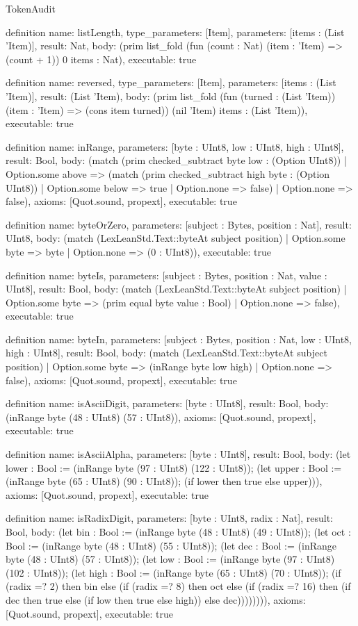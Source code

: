 \begin{lexlean}{TokenAudit}
\begin{semanticmodule}
definition{
  name: listLength,
  type_parameters: [Item],
  parameters: [items : (List 'Item)],
  result: Nat,
  body: (prim list_fold (fun (count : Nat) (item : 'Item) => (count + 1)) 0 items : Nat),
  executable: true
}

definition{
  name: reversed,
  type_parameters: [Item],
  parameters: [items : (List 'Item)],
  result: (List 'Item),
  body: (prim list_fold (fun (turned : (List 'Item)) (item : 'Item) => (cons item turned)) (nil 'Item) items : (List 'Item)),
  executable: true
}

definition{
  name: inRange,
  parameters: [byte : UInt8, low : UInt8, high : UInt8],
  result: Bool,
  body: (match (prim checked_subtract byte low : (Option UInt8))
    | Option.some above => (match (prim checked_subtract high byte : (Option UInt8))
      | Option.some below => true
      | Option.none => false)
    | Option.none => false),
  axioms: [Quot.sound, propext],
  executable: true
}

definition{
  name: byteOrZero,
  parameters: [subject : Bytes, position : Nat],
  result: UInt8,
  body: (match (LexLeanStd.Text::byteAt subject position)
    | Option.some byte => byte
    | Option.none => (0 : UInt8)),
  executable: true
}

definition{
  name: byteIs,
  parameters: [subject : Bytes, position : Nat, value : UInt8],
  result: Bool,
  body: (match (LexLeanStd.Text::byteAt subject position)
    | Option.some byte => (prim equal byte value : Bool)
    | Option.none => false),
  executable: true
}

definition{
  name: byteIn,
  parameters: [subject : Bytes, position : Nat, low : UInt8, high : UInt8],
  result: Bool,
  body: (match (LexLeanStd.Text::byteAt subject position)
    | Option.some byte => (inRange byte low high)
    | Option.none => false),
  axioms: [Quot.sound, propext],
  executable: true
}

definition{
  name: isAsciiDigit,
  parameters: [byte : UInt8],
  result: Bool,
  body: (inRange byte (48 : UInt8) (57 : UInt8)),
  axioms: [Quot.sound, propext],
  executable: true
}

definition{
  name: isAsciiAlpha,
  parameters: [byte : UInt8],
  result: Bool,
  body: (let lower : Bool := (inRange byte (97 : UInt8) (122 : UInt8)); (let upper : Bool := (inRange byte (65 : UInt8) (90 : UInt8)); (if lower then true else upper))),
  axioms: [Quot.sound, propext],
  executable: true
}

definition{
  name: isRadixDigit,
  parameters: [byte : UInt8, radix : Nat],
  result: Bool,
  body: (let bin : Bool := (inRange byte (48 : UInt8) (49 : UInt8)); (let oct : Bool := (inRange byte (48 : UInt8) (55 : UInt8)); (let dec : Bool := (inRange byte (48 : UInt8) (57 : UInt8)); (let low : Bool := (inRange byte (97 : UInt8) (102 : UInt8)); (let high : Bool := (inRange byte (65 : UInt8) (70 : UInt8)); (if (radix =? 2) then bin else (if (radix =? 8) then oct else (if (radix =? 16) then (if dec then true else (if low then true else high)) else dec)))))))),
  axioms: [Quot.sound, propext],
  executable: true
}


\end{semanticmodule}
\end{lexlean}
